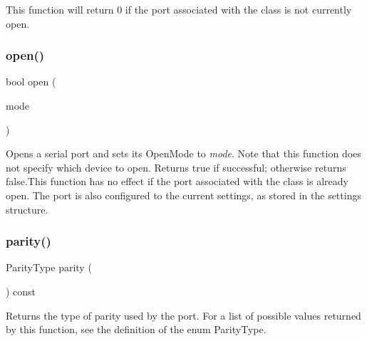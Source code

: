 \begin{DoxyCode}{0}
\DoxyCodeLine{------      ----}
\end{DoxyCode}


This function will return 0 if the port associated with the class is not currently open. \mbox{\label{class_qext_serial_port_a2afbc8095ef88403b74378933332d287}} 
\subsubsection{\texorpdfstring{open()}{open()}}
{\footnotesize\ttfamily bool open (\begin{DoxyParamCaption}\item[{Open\+Mode}]{mode }\end{DoxyParamCaption})}

Opens a serial port and sets its Open\+Mode to {\itshape mode}. Note that this function does not specify which device to open. Returns true if successful; otherwise returns false.\+This function has no effect if the port associated with the class is already open. The port is also configured to the current settings, as stored in the settings structure. \mbox{\label{class_qext_serial_port_adc80d1c0705ed88b6472883937ad3c20}} 
\subsubsection{\texorpdfstring{parity()}{parity()}}
{\footnotesize\ttfamily Parity\+Type parity (\begin{DoxyParamCaption}{ }\end{DoxyParamCaption}) const}

Returns the type of parity used by the port. For a list of possible values returned by this function, see the definition of the enum Parity\+Type. \mbox{\label{class_qext_serial_port_a3b6261ecdae0766f83d351e39be9130d}} 
